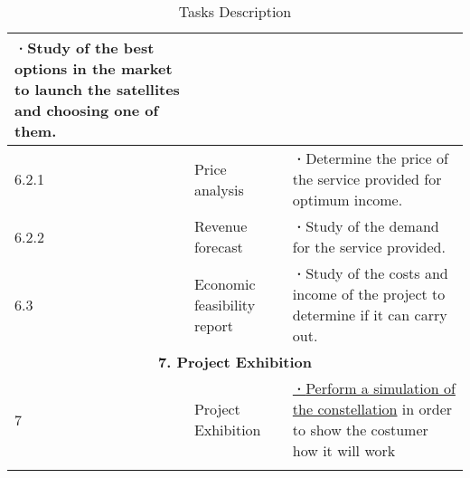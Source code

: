 \begin{longtable}{ | p{1.3cm} | p{3cm} | p{11cm} |}
\textbf{·}Study of the best options in the market to launch the satellites and choosing one of them.\\ 
\hline
6.2.1 & Price analysis &   
\textbf{·}Determine the price of the service provided for optimum income.\\ 
\hline
6.2.2 & Revenue forecast & 
\textbf{·}Study of the demand for the service provided.\\ 
\hline
6.3 & Economic feasibility report & 
\textbf{·}Study of the costs and income of the project to determine if it can carry out.\\ 
 \hline
 \multicolumn{3}{|c|}{\textbf{7. Project Exhibition}} \\ \hline
7 & Project Exhibition & 

\underline{\textbf{·}Perform a simulation of the constellation} in order to show the costumer how it will work 
\\ 
\hline
\caption{Tasks Description} \\
\end{longtable}